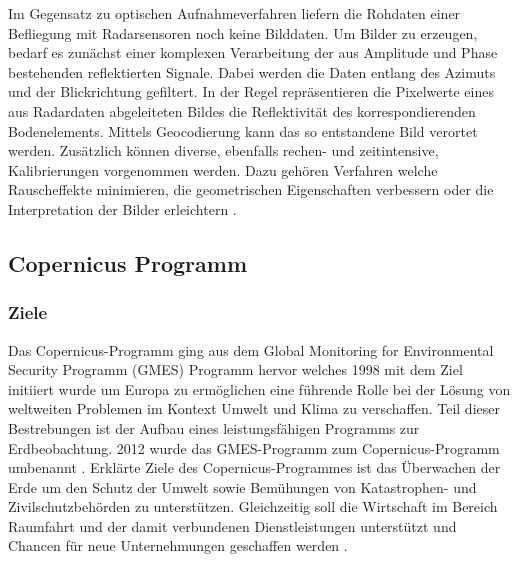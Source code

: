 Im Gegensatz zu optischen Aufnahmeverfahren liefern die Rohdaten 
einer Befliegung mit Radarsensoren noch keine Bilddaten. Um Bilder zu erzeugen, bedarf es zunächst einer komplexen Verarbeitung der aus Amplitude und Phase bestehenden 
reflektierten Signale. Dabei werden die Daten entlang des Azimuts und der Blickrichtung gefiltert. In der Regel repräsentieren die Pixelwerte eines aus Radardaten 
abgeleiteten Bildes die Reflektivität des korrespondierenden Bodenelements. Mittels Geocodierung kann das so entstandene Bild verortet werden. Zusätzlich können diverse,
ebenfalls rechen- und zeitintensive, Kalibrierungen vorgenommen werden. Dazu gehören Verfahren welche Rauscheffekte minimieren, die geometrischen Eigenschaften verbessern 
oder die Interpretation der Bilder erleichtern \cite{tutorial_on_sar}.

\subsection{Copernicus Programm}
\subsubsection{Ziele}
Das Copernicus-Programm ging aus dem Global Monitoring for Environmental Security Programm (GMES) Programm hervor welches 1998 mit dem Ziel initiiert wurde um Europa 
zu ermöglichen eine führende Rolle bei der Lösung von weltweiten Problemen im Kontext Umwelt und Klima zu verschaffen. Teil dieser Bestrebungen ist der Aufbau eines 
leistungsfähigen Programms zur Erdbeobachtung. 2012 wurde das GMES-Programm zum Copernicus-Programm umbenannt \cite{history_of_copernicus}.
Erklärte Ziele des Copernicus-Programmes ist das Überwachen der Erde um den Schutz der Umwelt sowie Bemühungen von Katastrophen- und Zivilschutzbehörden zu 
unterstützen. Gleichzeitig soll die Wirtschaft im Bereich Raumfahrt und der damit verbundenen Dienstleistungen unterstützt und Chancen für neue Unternehmungen geschaffen
werden \cite{copernicus_regulation}.


